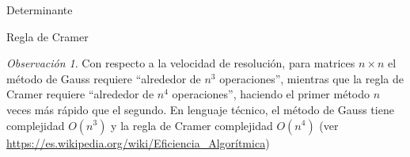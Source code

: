 \documentclass[a4paper,12pt,twoside,spanish]{amsbook}
\theoremstyle{definition}
\theoremstyle{remark}
\newtheorem{observacion}{Observaci\'on}[section]
\begin{document}
\begin{chapter}{Determinante}
\begin{section}{Regla de Cramer}
\begin{observacion}
		 		Con respecto a la velocidad  de resolución, para matrices $n \times n$ el método de Gauss requiere ``alrededor de $n^3$ operaciones'', mientras que la regla de Cramer requiere ``alrededor de $n^4$ operaciones'', haciendo el primer método $n$ veces más rápido que el segundo. En  lenguaje técnico, el método de Gauss tiene complejidad $O(n^3)$ y la regla de Cramer complejidad $O(n^4)$ (ver
		 		\href{ https://es.wikipedia.org/wiki/Eficiencia\_Algorítmica}{ https://es.wikipedia.org/wiki/Eficiencia\_Algorítmica}) 
		 	\end{observacion}
		 	
		 \end{section}
	\end{chapter}
	

\printindex
\end{document}
